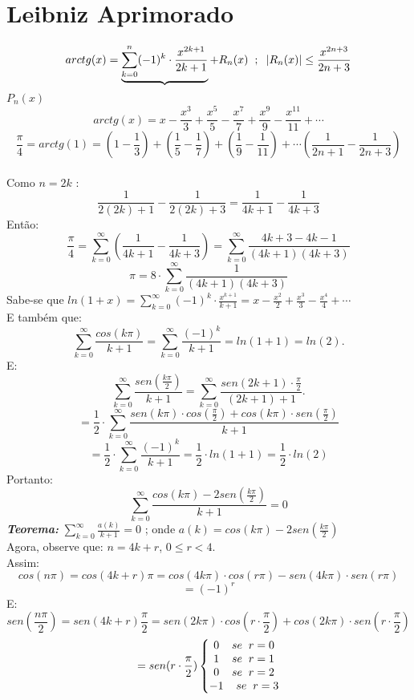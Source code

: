 \documentclass[12pt]{article}
\begin{document}
\section{Leibniz Aprimorado}
\[ arctg(x)=\underbrace{\sum_{k=0}^{n}(-1)^k\cdot\frac{x^{2k+1}}{2k+1}}+R_n(x)\hspace{0.2cm};\hspace{0.2cm}\left|R_n(x)\right|\leq\frac{x^{2n+3}}{2n+3}\]
\hspace{4.7cm} \(P_n(x)\)\\
\[arctg(x)=x-\frac{x^3}{3}+\frac{x^5}{5}-\frac{x^7}{7}+\frac{x^9}{9}-\frac{x^11}{11}+\cdots \]
\[\frac{\pi}{4}=arctg(1)=\left(1-\frac{1}{3}\right)+\left(\frac{1}{5}-\frac{1}{7}\right)+\left(\frac{1}{9}-\frac{1}{11}\right)+\cdots\left(\frac{1}{2n+1}-\frac{1}{2n+3}\right)\]
\vspace{0.1cm}\\
Como \(n=2k\) :
\[\frac{1}{2(2k)+1}-\frac{1}{2(2k)+3}=\frac{1}{4k+1}-\frac{1}{4k+3}\]
Então:
\[\frac{\pi}{4}=\sum_{k=0}^{\infty}\left(\frac{1}{4k+1}-\frac{1}{4k+3}\right)=\sum_{k=0}^{\infty}\frac{4k+3-4k-1}{(4k+1)(4k+3)}\]
\[\pi=8\cdot\sum_{k=0}^{\infty}\frac{1}{(4k+1)(4k+3)}\]
\newpage
Sabe-se que \(ln(1+x)=\sum_{k=0}^{\infty}(-1)^k\cdot\frac{x^{k+1}}{k+1}=x-\frac{x^2}{2}+\frac{x^3}{3}-\frac{x^4}{4}+\cdots\)
\vspace{0.2cm}\\
E também que:
\[\sum_{k=0}^{\infty}\frac{cos(k\pi)}{k+1}=\sum_{k=0}^{\infty}\frac{(-1)^k}{k+1}=ln(1+1)=ln(2).\]
E:
\[\sum_{k=0}^{\infty}\frac{sen(\frac{k\pi}{2})}{k+1}=\sum_{k=0}^{\infty}\frac{sen(2k+1)\cdot\frac{\pi}{2}}{(2k+1)+1}.\]
\[=\frac{1}{2}\cdot\sum_{k=0}^{\infty}\frac{sen(k\pi)\cdot cos(\frac{\pi}{2})+cos(k\pi)\cdot sen(\frac{\pi}{2})}{k+1}\]
\[=\frac{1}{2}\cdot\sum_{k=0}^{\infty}\frac{(-1)^k}{k+1}=\frac{1}{2}\cdot ln(1+1)=\frac{1}{2}\cdot ln(2)\]
Portanto:
\[\sum_{k=0}^{\infty}\frac{cos(k\pi)-2sen(\frac{k\pi}{2})}{k+1}=0\]
\textbf{\textit{Teorema:}} \(\sum_{k=0}^{\infty}\frac{a(k)}{k+1}=0\) ; onde \(a(k)=cos(k\pi)-2sen(\frac{k\pi}{2})\)
\vspace{0.5cm}\\
Agora, observe que: \(n=4k+r\), \(0\leq r < 4\).\\
Assim:
\[cos(n\pi)=cos(4k+r)\pi=cos(4k\pi)\cdot cos(r\pi)-sen(4k\pi)\cdot sen(r\pi)\]
\[=(-1)^r\]
E:
\[sen(\frac{n\pi}{2})=sen(4k+r)\frac{\pi}{2}=sen(2k\pi)\cdot cos(r\cdot\frac{\pi}{2})+cos(2k\pi)\cdot sen(r\cdot\frac{\pi}{2})\]
\[=sen(r\cdot\frac{\pi}{2})\left\{\begin{matrix}0\hspace{0.4cm}se\hspace{0.2cm}r=0\\1\hspace{0.4cm}se\hspace{0.2cm}r=1\\0\hspace{0.4cm}se\hspace{0.2cm}r=2\\-1\hspace{0.4cm}se\hspace{0.2cm}r=3\\\end{matrix}\right.\]
\end{document}
